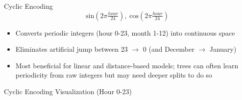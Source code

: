 \documentclass[11pt,compress,t,notes=noshow, xcolor=table]{beamer}
\begin{document}
\begin{vbframe}{Cyclic Encoding}
  \vfill
  \[\text{sin}(2\pi \tfrac{hour}{24}),\; \text{cos}(2\pi \tfrac{hour}{24})\]
  \vfill
  \begin{itemize}
    \item Converts periodic integers (hour 0-23, month 1-12) into continuous space
    \item Eliminates artificial jump between 23 \(\rightarrow\) 0 (and December \(\rightarrow\) January)
    \item Most beneficial for linear and distance-based models; trees can often learn periodicity from raw integers but may need deeper splits to do so
  \end{itemize}
  \vfill
\end{vbframe}

\begin{vbframe}{Cyclic Encoding Visualization (Hour 0-23)}
  \begin{figure}
    \centering
  \end{figure}
\end{vbframe}
\end{document}

